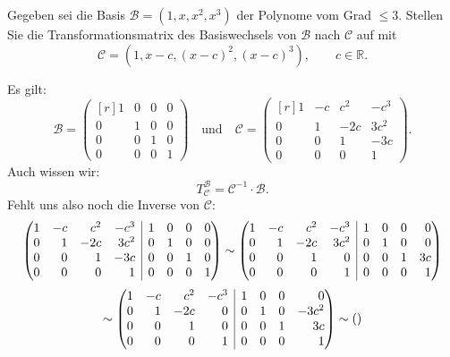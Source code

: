 \documentclass[answers]{exam}
\makeatletter
\newenvironment{sysmatrix}[1]
  {\left(\begin{array}{@{}#1@{}}}
  {\end{array}\right)}
\newcommand{\vektor}[1]{\begin{pmatrix*}[r] #1 \end{pmatrix*}}
\newcommand{\R}{\mathbb{R}}
\newcommand{\B}{\mathcal{B}}
\makeatother
\begin{document}
\begin{questions}
    \newpage
    \question
    Gegeben sei die Basis $\B = (1, x, x^2, x^3)$ der Polynome vom Grad $\leq 3$.
    Stellen Sie die Transformationsmatrix des Basiswechsels von $\B$ nach $\mathcal{C}$ auf mit
    $$
        \mathcal{C} = (1, x-c, (x-c)^2, (x-c)^3), \qquad c\in\R .
    $$
    \begin{solution}
        Es gilt:
        $$
            \B = \vektor{1 & 0 & 0 & 0 \\ 0 & 1 & 0 & 0 \\ 0 & 0 & 1 & 0 \\ 0 & 0 & 0 & 1} \quad \text{und} \quad \mathcal{C} = \vektor{1 & -c & c^2 & -c^3 \\ 0 & 1 & -2c & 3c^2 \\ 0 & 0 & 1 & -3c \\ 0 & 0 & 0 & 1}.
        $$
        Auch wissen wir:
        $$
            T^\B_\mathcal{C} = \mathcal{C}^{-1} \cdot \B.
        $$
        Fehlt uns also noch die Inverse von $\mathcal{C}$:
        $$
            \begin{sysmatrix}{rrrr|rrrr}
                1 & -c & c^2 & -c^3 & 1 & 0 & 0 & 0 \\
                0 & 1 & -2c & 3c^2 & 0 & 1 & 0 & 0  \\
                0 & 0 & 1 & -3c & 0 & 0 & 1 & 0  \\
                0 & 0 & 0 & 1 & 0 & 0 & 0 & 1
            \end{sysmatrix}
            \sim
            \begin{sysmatrix}{rrrr|rrrr}
                1 & -c & c^2 & -c^3 & 1 & 0 & 0 & 0 \\
                0 & 1 & -2c & 3c^2 & 0 & 1 & 0 & 0  \\
                0 & 0 & 1 & 0 & 0 & 0 & 1 & 3c  \\
                0 & 0 & 0 & 1 & 0 & 0 & 0 & 1
            \end{sysmatrix}
        $$
        $$
            \sim
            \begin{sysmatrix}{rrrr|rrrr}
                1 & -c & c^2 & -c^3 & 1 & 0 & 0 & 0 \\
                0 & 1 & -2c & 0 & 0 & 1 & 0 & -3c^2  \\
                0 & 0 & 1 & 0 & 0 & 0 & 1 & 3c  \\
                0 & 0 & 0 & 1 & 0 & 0 & 0 & 1
            \end{sysmatrix}
            \sim
            \begin{sysmatrix}{rrrr|rrrr}

\end{sysmatrix}$$
\end{solution}
\end{questions}
\end{document}
